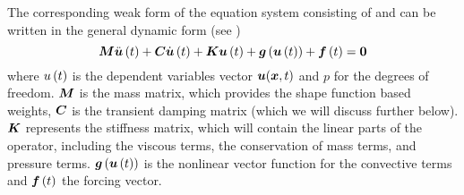 The corresponding weak form of the equation system consisting of
 and 
can be written in the general dynamic form (see )
\begin{equation}
  \matr{M}\fnof{\ddot{\vectr{u}}}{t}+\matr{C}\fnof{\dot{\vectr{u}}}{t}+\matr{K}\fnof{\vectr{u}}{t}+
  \fnof{\vectr{g}}{\fnof{\vectr{u}}{t}}+\fnof{\vectr{f}}{t}=\vectr{0}
  \label{eqn:generaldynamicnonlinear}
\end{equation}
where $ u\left( t \right) $ is the dependent variables vector $ \boldsymbol{u} ( \boldsymbol{x} ,t)$ and $p$
for the degrees of freedom. $\matr{M}$ is the mass matrix, which provides the
shape function based weights, $\matr{C}$ is the transient damping matrix
(which we will discuss further below). $\matr{K}$ represents the stiffness
matrix, which will contain the linear parts of the operator, including the
viscous terms, the conservation of mass terms, and pressure
terms. $  \boldsymbol{g} \left(   \boldsymbol{u} \left( t \right)  \right) $ is the nonlinear vector
function for the convective terms and $  \boldsymbol{f} \left( t \right) $ the forcing
vector.

